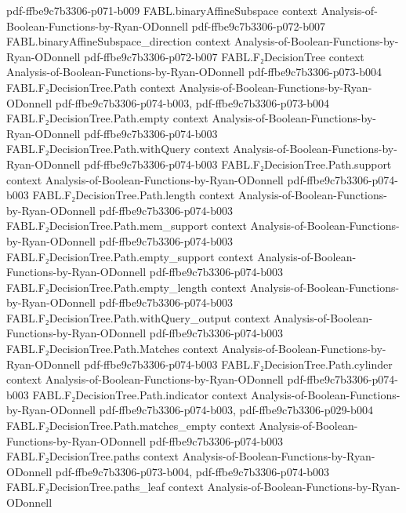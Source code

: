 \begin{theorem}
  {pdf-ffbe9c7b3306-p071-b009}
\proofstep
  {FABL.binaryAffineSubspace}
  {context}
  {Analysis-of-Boolean-Functions-by-Ryan-ODonnell}
  {pdf-ffbe9c7b3306-p072-b007}
\proofstep
  {FABL.binaryAffineSubspace_direction}
  {context}
  {Analysis-of-Boolean-Functions-by-Ryan-ODonnell}
  {pdf-ffbe9c7b3306-p072-b007}
\proofstep
  {FABL.F₂DecisionTree}
  {context}
  {Analysis-of-Boolean-Functions-by-Ryan-ODonnell}
  {pdf-ffbe9c7b3306-p073-b004}
\proofstep
  {FABL.F₂DecisionTree.Path}
  {context}
  {Analysis-of-Boolean-Functions-by-Ryan-ODonnell}
  {pdf-ffbe9c7b3306-p074-b003,
    pdf-ffbe9c7b3306-p073-b004}
\proofstep
  {FABL.F₂DecisionTree.Path.empty}
  {context}
  {Analysis-of-Boolean-Functions-by-Ryan-ODonnell}
  {pdf-ffbe9c7b3306-p074-b003}
\proofstep
  {FABL.F₂DecisionTree.Path.withQuery}
  {context}
  {Analysis-of-Boolean-Functions-by-Ryan-ODonnell}
  {pdf-ffbe9c7b3306-p074-b003}
\proofstep
  {FABL.F₂DecisionTree.Path.support}
  {context}
  {Analysis-of-Boolean-Functions-by-Ryan-ODonnell}
  {pdf-ffbe9c7b3306-p074-b003}
\proofstep
  {FABL.F₂DecisionTree.Path.length}
  {context}
  {Analysis-of-Boolean-Functions-by-Ryan-ODonnell}
  {pdf-ffbe9c7b3306-p074-b003}
\proofstep
  {FABL.F₂DecisionTree.Path.mem_support}
  {context}
  {Analysis-of-Boolean-Functions-by-Ryan-ODonnell}
  {pdf-ffbe9c7b3306-p074-b003}
\proofstep
  {FABL.F₂DecisionTree.Path.empty_support}
  {context}
  {Analysis-of-Boolean-Functions-by-Ryan-ODonnell}
  {pdf-ffbe9c7b3306-p074-b003}
\proofstep
  {FABL.F₂DecisionTree.Path.empty_length}
  {context}
  {Analysis-of-Boolean-Functions-by-Ryan-ODonnell}
  {pdf-ffbe9c7b3306-p074-b003}
\proofstep
  {FABL.F₂DecisionTree.Path.withQuery_output}
  {context}
  {Analysis-of-Boolean-Functions-by-Ryan-ODonnell}
  {pdf-ffbe9c7b3306-p074-b003}
\proofstep
  {FABL.F₂DecisionTree.Path.Matches}
  {context}
  {Analysis-of-Boolean-Functions-by-Ryan-ODonnell}
  {pdf-ffbe9c7b3306-p074-b003}
\proofstep
  {FABL.F₂DecisionTree.Path.cylinder}
  {context}
  {Analysis-of-Boolean-Functions-by-Ryan-ODonnell}
  {pdf-ffbe9c7b3306-p074-b003}
\proofstep
  {FABL.F₂DecisionTree.Path.indicator}
  {context}
  {Analysis-of-Boolean-Functions-by-Ryan-ODonnell}
  {pdf-ffbe9c7b3306-p074-b003,
    pdf-ffbe9c7b3306-p029-b004}
\proofstep
  {FABL.F₂DecisionTree.Path.matches_empty}
  {context}
  {Analysis-of-Boolean-Functions-by-Ryan-ODonnell}
  {pdf-ffbe9c7b3306-p074-b003}
\proofstep
  {FABL.F₂DecisionTree.paths}
  {context}
  {Analysis-of-Boolean-Functions-by-Ryan-ODonnell}
  {pdf-ffbe9c7b3306-p073-b004,
    pdf-ffbe9c7b3306-p074-b003}
\proofstep
  {FABL.F₂DecisionTree.paths_leaf}
  {context}
  {Analysis-of-Boolean-Functions-by-Ryan-ODonnell}

\end{theorem}

